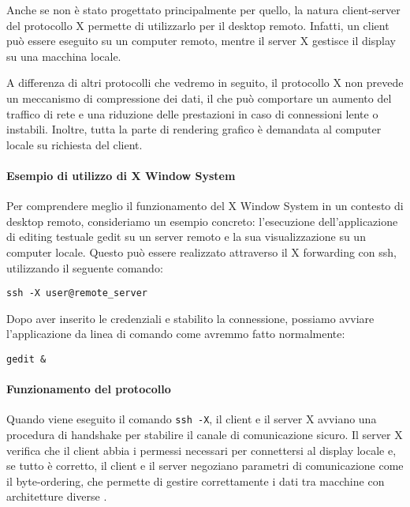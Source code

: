 \documentclass[12pt,a4paper,openright,twoside]{book}
\begin{document}
Anche se non è stato progettato principalmente per quello, la natura client-server del protocollo X permette di utilizzarlo per il desktop remoto. Infatti, un client può essere eseguito su un computer remoto, mentre il server X gestisce il display su una macchina locale.

A differenza di altri protocolli che vedremo in seguito, il protocollo X non prevede un meccanismo di compressione dei dati, il che può comportare un aumento del traffico di rete e una riduzione delle prestazioni in caso di connessioni lente o instabili. Inoltre, tutta la parte di rendering grafico è demandata al computer locale su richiesta del client.

\paragraph{Esempio di utilizzo di X Window System}

Per comprendere meglio il funzionamento del X Window System in un contesto di desktop remoto, consideriamo un esempio concreto: l'esecuzione dell'applicazione di editing testuale gedit su un server remoto e la sua visualizzazione su un computer locale. Questo può essere realizzato attraverso il X forwarding con ssh, utilizzando il seguente comando:

\begin{verbatim}
ssh -X user@remote_server
\end{verbatim}

Dopo aver inserito le credenziali e stabilito la connessione, possiamo avviare l'applicazione da linea di comando come avremmo fatto normalmente:

\begin{verbatim}
gedit &
\end{verbatim}

\paragraph{Funzionamento del protocollo}

Quando viene eseguito il comando \texttt{ssh -X}, il client e il server X avviano una procedura di handshake per stabilire il canale di comunicazione sicuro. Il server X verifica che il client abbia i permessi necessari per connettersi al display locale e, se tutto è corretto, il client e il server negoziano parametri di comunicazione come il byte-ordering, che permette di gestire correttamente i dati tra macchine con architetture diverse \cite{coopersmith2024x}.
\end{document}
